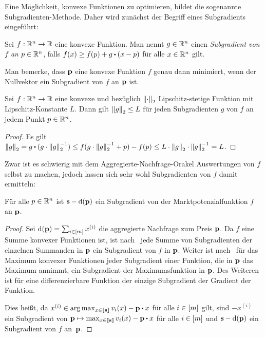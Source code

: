 Eine Möglichkeit, konvexe Funktionen zu optimieren, bildet die sogenannte Subgradienten-Methode.
Daher wird zunächst der Begriff eines Subgradients eingeführt:
\begin{definition}[Subgradient]
	Sei $f:\mathbb{R}^n \rightarrow \mathbb{R}$ eine konvexe Funktion.
	Man nennt $g\in\mathbb{R}^n$ einen \emph{Subgradient von $f$ an $p\in\mathbb{R}^n$}, falls $f(x) \geq f(p) + g\bcdot (x - p)$ für alle $x\in\mathbb{R}^n$ gilt.
\end{definition}
Man bemerke, dass $\mathbf{p}$ eine konvexe Funktion $f$ genau dann minimiert, wenn der Nullvektor ein Subgradient von $f$ an $\mathbf{p}$ ist.
\begin{proposition}\label{prop-convex-lipschitz}
Sei $f: \mathbb{R}^n \rightarrow \mathbb{R}$ eine konvexe und bezüglich $\left\lVert \cdot \right\rVert_2$ Lipschitz-stetige Funktion mit Lipschitz-Konstante $L$.
Dann gilt $\left\lVert g \right\rVert_2\leq L$ für jeden Subgradienten $g$ von $f$ an jedem Punkt $p\in\mathbb{R}^n$.
\end{proposition}
\begin{proof}
Es gilt $\norm{g} = g \bcdot (g \cdot \norm{g}^{-1}) \leq  f(g \cdot \norm{g}^{-1} + p) - f(p) \leq L \cdot \norm{g}\cdot \norm{g}^{-1} = L$.
\end{proof}

Zwar ist es schwierig mit dem Aggregierte-Nachfrage-Orakel Auswertungen von $f$ selbst zu machen, jedoch lassen sich sehr wohl Subgradienten von $f$ damit ermitteln:
\begin{lemma}\label{lemma-subgradient}
	Für alle $p\in\mathbb{R}^n$ ist $\mathbf{s} - \operatorname{d}(\mathbf{p})$ ein Subgradient von der Marktpotenzialfunktion $f$ an $\mathbf{p}$.
\end{lemma}
\begin{proof}
	Sei $\operatorname{d}(\mathbf{p}) = \sum_{i\in\left[ m \right]} x^{(i)}$ die aggregierte Nachfrage zum Preis $\mathbf{p}$.
	Da $f$ eine Summe konvexer Funktionen ist, ist nach~\cite[Theorem~1.12]{Shor1985} jede Summe von Subgradienten der einzelnen Summanden in $\mathbf{p}$ ein Subgradient von $f$ in $\mathbf{p}$.
	Weiter ist nach~\cite[Theorem~1.13]{Shor1985} für das Maximum konvexer Funktionen jeder Subgradient einer Funktion, die in $\mathbf{p}$ das Maximum annimmt, ein Subgradient der Maximumsfunktion in $\mathbf{p}$.
	Des Weiteren ist für eine differenzierbare Funktion der einzige Subgradient der Gradient der Funktion.
	
	Dies heißt, da $x^{(i)}\in \arg\max_{x\in\ffirst{\fs}} v_i(x) - \fp \bcdot x$ für alle $i\in\left[ m \right]$ gilt, sind $-x^{(i)}$ ein Subgradient von $\fp \mapsto \max_{x\in\ffirst{\fs}} v_i(x) - \fp \bcdot x$ für alle $i\in\left[ m \right]$ und $\mathbf{s} - \operatorname{d}(\mathbf{p})$ ein Subgradient von $f$ an~$\mathbf{p}$.
\end{proof}

